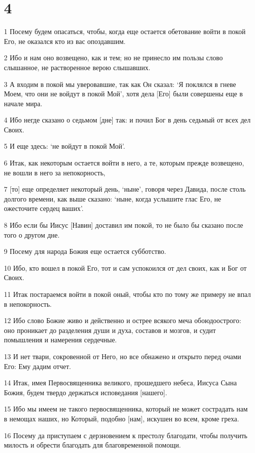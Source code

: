 \chapter{4}

\par 1 Посему будем опасаться, чтобы, когда еще остается обетование войти в покой Его, не оказался кто из вас опоздавшим.
\par 2 Ибо и нам оно возвещено, как и тем; но не принесло им пользы слово слышанное, не растворенное верою слышавших.
\par 3 А входим в покой мы уверовавшие, так как Он сказал: `Я поклялся в гневе Моем, что они не войдут в покой Мой', хотя дела [Его] были совершены еще в начале мира.
\par 4 Ибо негде сказано о седьмом [дне] так: и почил Бог в день седьмый от всех дел Своих.
\par 5 И еще здесь: `не войдут в покой Мой'.
\par 6 Итак, как некоторым остается войти в него, а те, которым прежде возвещено, не вошли в него за непокорность,
\par 7 [то] еще определяет некоторый день, `ныне', говоря через Давида, после столь долгого времени, как выше сказано: `ныне, когда услышите глас Его, не ожесточите сердец ваших'.
\par 8 Ибо если бы Иисус [Навин] доставил им покой, то не было бы сказано после того о другом дне.
\par 9 Посему для народа Божия еще остается субботство.
\par 10 Ибо, кто вошел в покой Его, тот и сам успокоился от дел своих, как и Бог от Своих.
\par 11 Итак постараемся войти в покой оный, чтобы кто по тому же примеру не впал в непокорность.
\par 12 Ибо слово Божие живо и действенно и острее всякого меча обоюдоострого: оно проникает до разделения души и духа, составов и мозгов, и судит помышления и намерения сердечные.
\par 13 И нет твари, сокровенной от Него, но все обнажено и открыто перед очами Его: Ему дадим отчет.
\par 14 Итак, имея Первосвященника великого, прошедшего небеса, Иисуса Сына Божия, будем твердо держаться исповедания [нашего].
\par 15 Ибо мы имеем не такого первосвященника, который не может сострадать нам в немощах наших, но Который, подобно [нам], искушен во всем, кроме греха.
\par 16 Посему да приступаем с дерзновением к престолу благодати, чтобы получить милость и обрести благодать для благовременной помощи.

